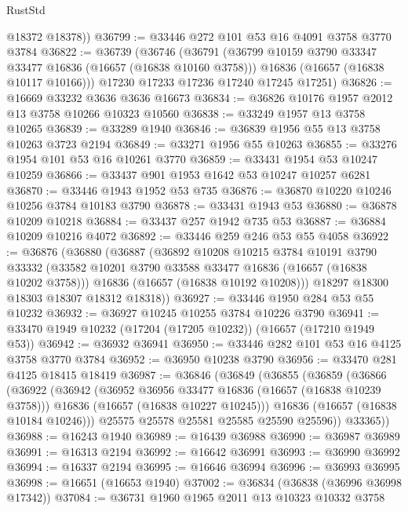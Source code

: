 \begin{lexlean}{RustStd}
\begin{coremodule}
        @18372
        @18378))
@36799 := @33446 @272 @101 @53 @16 @4091 @3758 @3770 @3784
@36822 := @36739
    (@36746
      (@36791
        (@36799 @10159 @3790 @33347 @33477 @16836 (@16657 (@16838 @10160 @3758)))
        @16836
        (@16657 (@16838 @10117 @10166)))
      @17230
      @17233
      @17236
      @17240
      @17245
      @17251)
@36826 := @16669 @33232 @3636 @3636 @16673
@36834 := @36826 @10176 @1957 @2012 @13 @3758 @10266 @10323 @10560
@36838 := @33249 @1957 @13 @3758 @10265
@36839 := @33289 @1940
@36846 := @36839 @1956 @55 @13 @3758 @10263 @3723 @2194
@36849 := @33271 @1956 @55 @10263
@36855 := @33276 @1954 @101 @53 @16 @10261 @3770
@36859 := @33431 @1954 @53 @10247 @10259
@36866 := @33437 @901 @1953 @1642 @53 @10247 @10257 @6281
@36870 := @33446 @1943 @1952 @53 @735
@36876 := @36870 @10220 @10246 @10256 @3784 @10183 @3790
@36878 := @33431 @1943 @53
@36880 := @36878 @10209 @10218
@36884 := @33437 @257 @1942 @735 @53
@36887 := @36884 @10209 @10216 @4072
@36892 := @33446 @259 @246 @53 @55 @4058
@36922 := @36876
    (@36880
      (@36887
        (@36892
          @10208
          @10215
          @3784
          @10191
          @3790
          @33332
          (@33582 @10201 @3790 @33588 @33477 @16836 (@16657 (@16838 @10202 @3758)))
          @16836
          (@16657 (@16838 @10192 @10208)))
        @18297
        @18300
        @18303
        @18307
        @18312
        @18318))
@36927 := @33446 @1950 @284 @53 @55 @10232
@36932 := @36927 @10245 @10255 @3784 @10226 @3790
@36941 := @33470 @1949 @10232 (@17204 (@17205 @10232)) (@16657 (@17210 @1949 @53))
@36942 := @36932 @36941
@36950 := @33446 @282 @101 @53 @16 @4125 @3758 @3770 @3784
@36952 := @36950 @10238 @3790
@36956 := @33470 @281 @4125 @18415 @18419
@36987 := @36846
    (@36849
      (@36855
        (@36859
          (@36866
            (@36922
              (@36942
                (@36952 @36956 @33477 @16836 (@16657 (@16838 @10239 @3758)))
                @16836
                (@16657 (@16838 @10227 @10245)))
              @16836
              (@16657 (@16838 @10184 @10246)))
            @25575
            @25578
            @25581
            @25585
            @25590
            @25596))
        @33365))
@36988 := @16243 @1940
@36989 := @16439 @36988
@36990 := @36987 @36989
@36991 := @16313 @2194
@36992 := @16642 @36991
@36993 := @36990 @36992
@36994 := @16337 @2194
@36995 := @16646 @36994
@36996 := @36993 @36995
@36998 := @16651 (@16653 @1940)
@37002 := @36834 (@36838 (@36996 @36998 @17342))
@37084 := @36731
    @1960
    @1965
    @2011
    @13
    @10323
    @10332
    @3758

\end{coremodule}
\end{lexlean}
